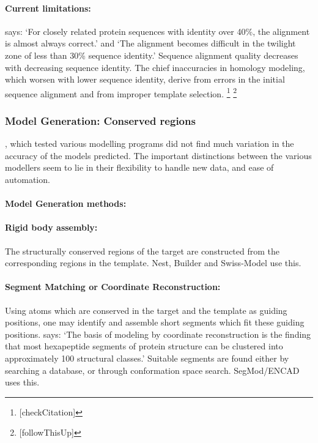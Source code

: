 \documentclass[10pt]{report}
\begin{document}
\paragraph{Current limitations:} \cite{marti-renom2000com} says: `For closely related protein sequences with identity over 40\%, the alignment is almost always correct.' and `The alignment becomes difficult in the twilight zone of less than 30\% sequence identity.' Sequence alignment quality decreases with decreasing sequence identity. \cite{dalton07} The chief inaccuracies in homology modeling, which worsen with lower sequence identity, derive from errors in the initial sequence alignment and from improper template selection. \cite{venclovas05} \footnote{[checkCitation]} \footnote{[followThisUp]}

\subsubsection{Model Generation: Conserved regions}

\cite{dalton07}, which tested various modelling programs did not find much variation in the accuracy of the models predicted. The important distinctions between the various modellers seem to lie in their flexibility to handle new data, and ease of automation.

\paragraph{Model Generation methods:}

\paragraph{Rigid body assembly:} The structurally conserved regions of the target are constructed from the corresponding regions in the template. Nest, Builder and Swiss-Model use this. \cite{dalton07}

\paragraph{Segment Matching or Coordinate Reconstruction:} Using atoms which are conserved in the target and the template as guiding positions, one may identify and assemble short segments which fit these guiding positions. \cite{marti-renom2000com} says: `The basis of modeling by coordinate reconstruction is the finding that most hexapeptide segments of protein structure can be clustered into approximately 100 structural classes.' Suitable segments are found either by searching a database, or through conformation space search. SegMod/ENCAD uses this. \cite{dalton07}
\end{document}
